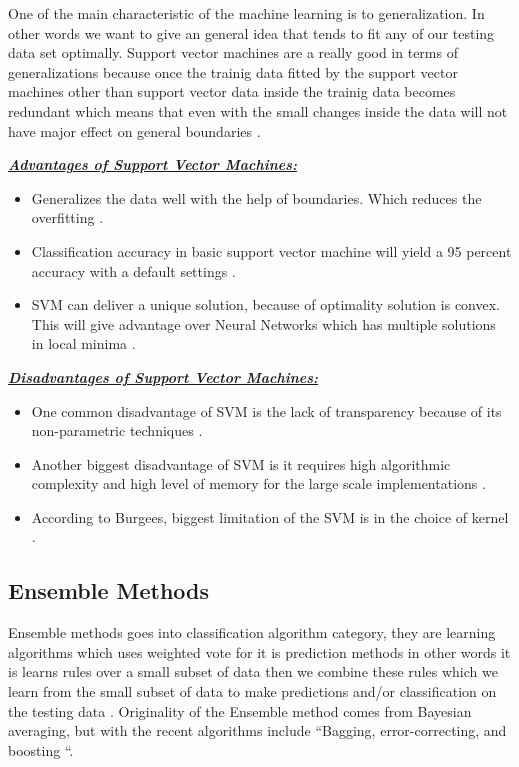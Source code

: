 \documentclass[sigconf]{acmart}
\begin{document}
\par One of the main characteristic of the machine learning is to generalization. In other words we want to give an general idea that tends to fit any of our testing data set optimally. Support vector machines are a really good in terms of generalizations because once the trainig data fitted by the support vector machines other than support vector data inside the trainig data becomes redundant which means that even with the small changes inside the data will not have major effect on general boundaries \cite{www-simafore-svm}. 

\textbf{\underline{\textit{Advantages of Support Vector Machines:}}} 
\begin{itemize}
\item Generalizes the data well with the help  of boundaries. Which reduces the overfitting \cite{www-simafore-svm}.
\item Classification accuracy in basic support vector machine will yield a 95 percent accuracy with a default settings \cite{www-simafore-svm}. 
\item SVM can deliver a unique solution, because of optimality solution is convex. This will give advantage over Neural Networks which has multiple solutions in local minima \cite{berlin-svm}.
\end{itemize}

\textbf{\underline{\textit{Disadvantages of Support Vector Machines:}}}

\begin{itemize}
\item One common disadvantage of SVM is the lack of transparency because of its non-parametric techniques \cite{berlin-svm}.
\item Another biggest disadvantage of SVM is it requires high algorithmic complexity and high level of memory for the large scale implementations \cite{verma-ssv}. 
\item According to Burgees, biggest limitation of the SVM is in the choice of kernel \cite{Burges1998}.
\end{itemize}

\subsection{Ensemble Methods}
Ensemble methods goes into classification algorithm category, they are learning algorithms which uses weighted vote for it is prediction methods in other words it is learns rules over a small subset of data then we combine these rules which we learn from the small subset of data to make predictions and/or classification on the testing data \cite{dietterich-ensemble}. Originality of the Ensemble method comes from Bayesian averaging, but with the recent algorithms include ``Bagging, error-correcting, and boosting \cite{dietterich-ensemble}``. 
\end{document}
